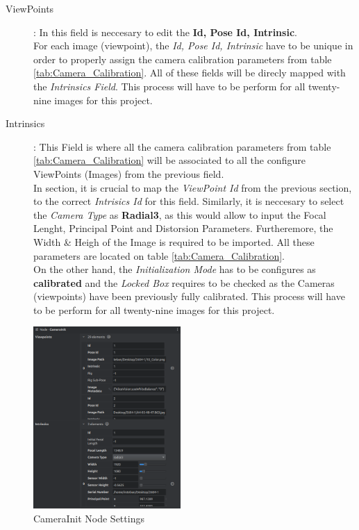 \documentclass[12pt]{report}
\begin{document}
\begin{description}
  \item[ViewPoints]: In this field is neccesary to edit the \textbf{Id, Pose Id, Intrinsic}. \\
  For each image (viewpoint), the \textit{Id, Pose Id, Intrinsic} have to be unique in order to properly assign the camera calibration parameters from table \ref{tab:Camera_Calibration}. 
  All of these fields will be direcly mapped with the \textit{Intrinsics Field}.
  This process will have to be perform for all twenty-nine images for this project. 
  \item[Intrinsics]: This Field is where all the camera calibration parameters from table \ref{tab:Camera_Calibration} will be associated to all the configure ViewPoints (Images) from the previous field.\\
  In section, it is crucial to map the \textit{ViewPoint Id} from the previous section, to the correct \textit{Intrisics Id} for this field.
  Similarly, it is neccesary to select the \textit{Camera Type} as \textbf{Radial3}, as this would allow to input the Focal Lenght, Principal Point and Distorsion Parameters.
  Furtheremore, the Width \& Heigh of the Image is required to be imported. All these parameters are located on table \ref{tab:Camera_Calibration}.\\
  On the other hand, the \textit{Initialization Mode} has to be configures as \textbf{calibrated} and the \textit{Locked Box} requires to be checked as the Cameras (viewpoints) have been previously fully calibrated.
  This process will have to be perform for all twenty-nine images for this project. 

\end{description}


\begin{figure}[H]%
  \centering
 \includegraphics[width=0.5\textwidth]{camera_init_node.png}
\caption{CameraInit Node Settings}
\label{fig:camera_init_node} 
\end{figure}
\end{document}
